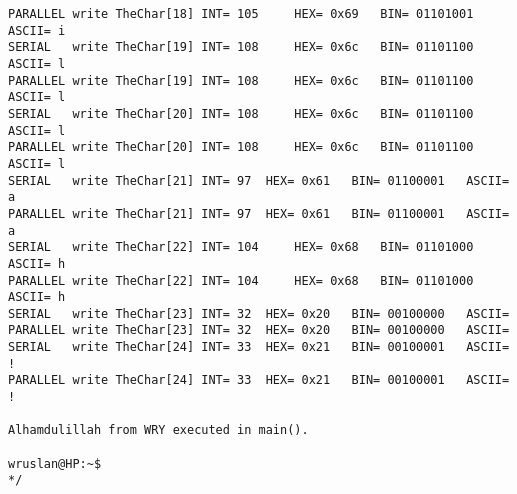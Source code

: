 \begin{lstlisting}[caption={App4-Concurrent Writes to Parallel and Serial Ports}, label=App4-Concurrent Writes to Parallel and Serial Ports]
PARALLEL write TheChar[18] INT= 105 	HEX= 0x69 	BIN= 01101001 	ASCII= i 
SERIAL   write TheChar[19] INT= 108 	HEX= 0x6c 	BIN= 01101100 	ASCII= l 
PARALLEL write TheChar[19] INT= 108 	HEX= 0x6c 	BIN= 01101100 	ASCII= l 
SERIAL   write TheChar[20] INT= 108 	HEX= 0x6c 	BIN= 01101100 	ASCII= l 
PARALLEL write TheChar[20] INT= 108 	HEX= 0x6c 	BIN= 01101100 	ASCII= l 
SERIAL   write TheChar[21] INT= 97 	HEX= 0x61 	BIN= 01100001 	ASCII= a 
PARALLEL write TheChar[21] INT= 97 	HEX= 0x61 	BIN= 01100001 	ASCII= a 
SERIAL   write TheChar[22] INT= 104 	HEX= 0x68 	BIN= 01101000 	ASCII= h 
PARALLEL write TheChar[22] INT= 104 	HEX= 0x68 	BIN= 01101000 	ASCII= h 
SERIAL   write TheChar[23] INT= 32 	HEX= 0x20 	BIN= 00100000 	ASCII=   
PARALLEL write TheChar[23] INT= 32 	HEX= 0x20 	BIN= 00100000 	ASCII=   
SERIAL   write TheChar[24] INT= 33 	HEX= 0x21 	BIN= 00100001 	ASCII= ! 
PARALLEL write TheChar[24] INT= 33 	HEX= 0x21 	BIN= 00100001 	ASCII= ! 

Alhamdulillah from WRY executed in main().

wruslan@HP:~$ 
*/
\end{lstlisting}
